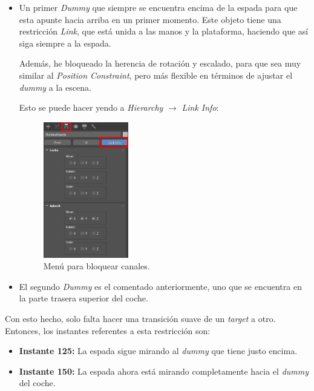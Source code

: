 \begin{itemize}
    \item Un primer \textit{Dummy} que siempre se encuentra encima de la espada para que esta apunte hacia arriba en un primer momento. Este objeto tiene una restricción \textit{Link}, que está unida a las manos y la plataforma, haciendo que así siga siempre a la espada.
    
    Además, he bloqueado la herencia de rotación y escalado, para que sea muy similar al \textit{Position Constraint}, pero más flexible en términos de ajustar el \textit{dummy} a la escena.

    Esto se puede hacer yendo a \textit{Hierarchy} $\rightarrow$ \textit{Link Info}:

    \begin{figure}[H]
        \centering
       \includegraphics[width=0.35\textwidth]{imagenes/espada/dummyTopHierarchy.png}
       \caption{Menú para bloquear canales.}
    \end{figure}

    \item El segundo \textit{Dummy} es el comentado anteriormente, uno que se encuentra en la parte trasera superior del coche.
\end{itemize}

Con esto hecho, solo falta hacer una transición suave de un \textit{target} a otro. Entonces, los instantes referentes a esta restricción son:

\begin{itemize}
    \item \textbf{Instante 125: }La espada sigue mirando al \textit{dummy} que tiene justo encima.
    \item \textbf{Instante 150: }La espada ahora está mirando completamente hacia el \textit{dummy} del coche.
\end{itemize}

